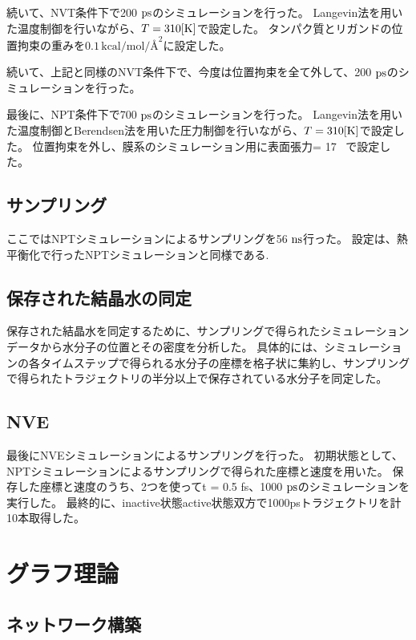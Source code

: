 続いて、NVT条件下で200 $\rm{ps}$のシミュレーションを行った。
Langevin法を用いた温度制御を行いながら、$T = 310 \rm{[K]}$で設定した。
タンパク質とリガンドの位置拘束の重みを$0.1 \, \text{kcal/mol/\AA}^2$に設定した。

続いて、上記と同様のNVT条件下で、今度は位置拘束を全て外して、200 $\rm{ps}$のシミュレーションを行った。

最後に、NP\gamma T条件下で700 $\rm{ps}$のシミュレーションを行った。
Langevin法を用いた温度制御とBerendsen法を用いた圧力制御を行いながら、$T = 310 \rm{[K]}$で設定した。
位置拘束を外し、膜系のシミュレーション用に表面張力\gamma = 17 \, で設定した。

\subsection{サンプリング}
ここではNP\gamma Tシミュレーションによるサンプリングを56 $\rm{ns}$行った。
設定は、熱平衡化で行ったNP\gamma Tシミュレーションと同様である.

\subsection{保存された結晶水の同定}
保存された結晶水を同定するために、サンプリングで得られたシミュレーションデータから水分子の位置とその密度を分析した。
具体的には、シミュレーションの各タイムステップで得られる水分子の座標を格子状に集約し、サンプリングで得られたトラジェクトリの半分以上で保存されている水分子を同定した。

\subsection{NVE}
最後にNVEシミュレーションによるサンプリングを行った。
初期状態として、NP\gamma Tシミュレーションによるサンプリングで得られた座標と速度を用いた。
保存した座標と速度のうち、2つを使って\Delta t = 0.5 fs、1000 $\rm{ps}$のシミュレーションを実行した。
最終的に、inactive状態active状態双方で1000psトラジェクトリを計10本取得した。

\section{グラフ理論}
\label{sec:graph theory}

\subsection{ネットワーク構築}

